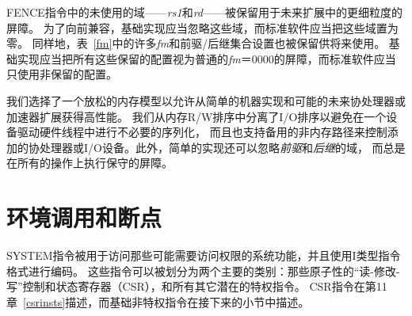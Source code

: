 FENCE指令中的未使用的域——{\em rs1}和{\em rd}——被保留用于未来扩展中的更细粒度的屏障。
为了向前兼容，基础实现应当忽略这些域，而标准软件应当把这些域置为零。
同样地，表~\ref{fm}中的许多{\em fm}和前驱/后继集合设置也被保留供将来使用。
基础实现应当把所有这些保留的配置视为普通的{\em fm}＝0000的屏障，而标准软件应当只使用非保留的配置。

\begin{commentary}
我们选择了一个放松的内存模型以允许从简单的机器实现和可能的未来协处理器或加速器扩展获得高性能。
我们从内存R/W排序中分离了I/O排序以避免在一个设备驱动硬件线程中进行不必要的序列化，
而且也支持备用的非内存路径来控制添加的协处理器或I/O设备。此外，简单的实现还可以忽略{\em 前驱}和{\em 后继}的域，
而总是在所有的操作上执行保守的屏障。
\end{commentary}

\section{环境调用和断点}

SYSTEM指令被用于访问那些可能需要访问权限的系统功能，并且使用I类型指令格式进行编码。
这些指令可以被划分为两个主要的类别：那些原子性的“读-修改-写”控制和状态寄存器（CSR），和所有其它潜在的特权指令。
CSR指令在第11章~\ref{csrinsts}描述，而基础非特权指令在接下来的小节中描述。

